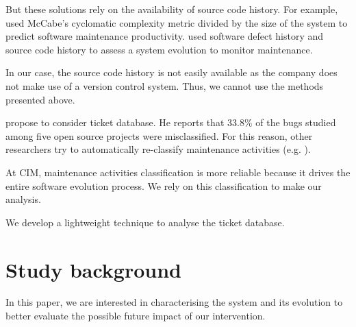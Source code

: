 \documentclass[10pt,conference]{IEEEtran}
\begin{document}

But these solutions rely on the availability of source code history. 
For example, \cite{gill91} used McCabe’s cyclomatic complexity metric divided by the size of the system to predict software maintenance productivity.
\cite{port18,Zhan10a} used software defect history and source code history to assess a system evolution to monitor maintenance. 

In our case, the source code history is not easily available as the company does not make use of a version control system.
Thus, we cannot use the methods presented above.

\cite{Herz13a} propose to consider ticket database.
He reports that $33.8\%$ of the bugs studied among five open source projects were misclassified.
For this reason, other researchers try to automatically re-classify maintenance activities (e.g. \cite{Mock20a,Levin19a}).
 
At CIM, maintenance activities classification is more reliable because it drives the entire software evolution process.
We rely on this classification to make our analysis.

We develop a lightweight technique to analyse the ticket database.


\section{Study background}
\label{sec:background}

In this paper, we are interested in characterising the system and its evolution to better evaluate the possible future impact of our intervention. 
\end{document}
